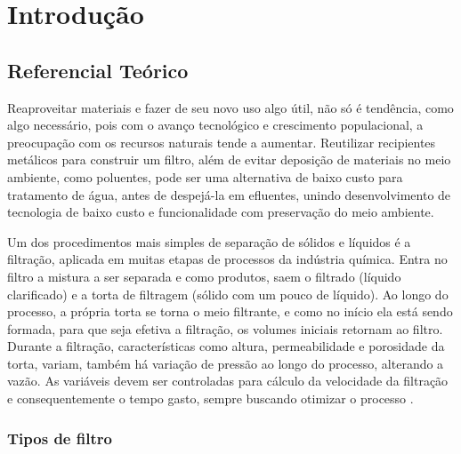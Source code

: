 \chapter{Introdução} \label{sec:intro}

\section{Referencial Teórico}\label{sec:refteo}

Reaproveitar materiais e fazer de seu novo uso algo útil, não só é tendência,
como algo necessário, pois com o avanço tecnológico e crescimento populacional,
a preocupação com os recursos naturais tende a aumentar. Reutilizar recipientes
metálicos para construir um filtro, além de evitar deposição de materiais no
meio ambiente, como poluentes, pode ser uma alternativa de baixo custo para
tratamento de água, antes de despejá-la em efluentes, unindo desenvolvimento de
tecnologia de baixo custo e funcionalidade com preservação do meio ambiente.

Um dos procedimentos mais simples de separação de sólidos e líquidos é a
filtração, aplicada em muitas etapas de processos da indústria química. Entra no
filtro a mistura a ser separada e como produtos, saem o filtrado (líquido
clarificado) e a torta de filtragem (sólido com um pouco de líquido). Ao longo
do processo, a própria torta se torna o meio filtrante, e como no início ela
está sendo formada, para que seja efetiva a filtração, os volumes iniciais
retornam ao filtro. Durante a filtração, características como altura,
permeabilidade e porosidade da torta, variam, também há variação de pressão ao
longo do processo, alterando a vazão. As variáveis devem ser controladas para
cálculo da velocidade da filtração e consequentemente o tempo gasto, sempre
buscando otimizar o processo .

\subsection{Tipos de filtro}

\label{subsec:tiposdefiltro}

